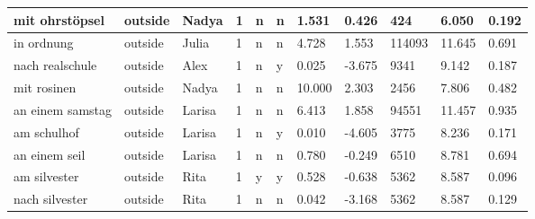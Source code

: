 \begin{longtable}{|p{4cm}|p{1cm}|p{1.2cm}|p{0.5cm}|p{0.5cm}|p{0.5cm}|R{1cm}|R{1cm}|R{1cm}|R{1cm}|R{1cm}|}
mit ohrst\"{o}psel         & outside           & Nadya         & 1                                   & n                          & n                          & 1.531      & 0.426         & 424                     & 6.050                         & 0.192                   \\ \hline
in ordnung                 & outside           & Julia         & 1                                   & n                          & n                          & 4.728      & 1.553         & 114093                  & 11.645                        & 0.691                   \\ \hline
nach realschule            & outside           & Alex          & 1                                   & n                          & y                          & 0.025      & -3.675        & 9341                    & 9.142                         & 0.187                   \\ \hline
mit rosinen                & outside           & Nadya         & 1                                   & n                          & n                          & 10.000     & 2.303         & 2456                    & 7.806                         & 0.482                   \\ \hline
an einem samstag           & outside           & Larisa        & 1                                   & n                          & n                          & 6.413      & 1.858         & 94551                   & 11.457                        & 0.935                   \\ \hline
am schulhof                & outside           & Larisa        & 1                                   & n                          & y                          & 0.010      & -4.605        & 3775                    & 8.236                         & 0.171                   \\ \hline
an einem seil              & outside           & Larisa        & 1                                   & n                          & n                          & 0.780      & -0.249        & 6510                    & 8.781                         & 0.694                   \\ \hline
am silvester               & outside           & Rita          & 1                                   & y                          & y                          & 0.528      & -0.638        & 5362                    & 8.587                         & 0.096                   \\ \hline
nach silvester             & outside           & Rita          & 1                                   & n                          & n                          & 0.042      & -3.168        & 5362                    & 8.587                         & 0.129                   \\ \hline

\end{longtable}
